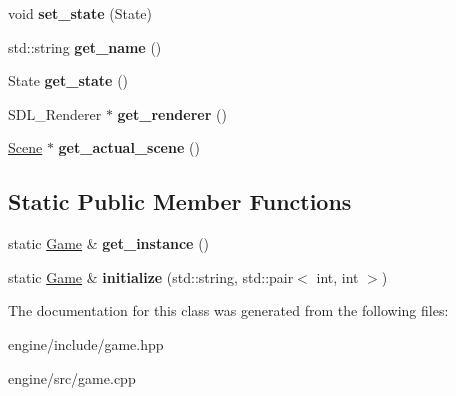 \begin{DoxyCompactItemize}
\item 
void {\bfseries set\+\_\+state} (State)\hypertarget{classengine_1_1_game_ad595dcad24a708d07939f050c02048ba}{}\label{classengine_1_1_game_ad595dcad24a708d07939f050c02048ba}

\item 
std\+::string {\bfseries get\+\_\+name} ()\hypertarget{classengine_1_1_game_a66f7b739325c22c7f782a947c83ceb7e}{}\label{classengine_1_1_game_a66f7b739325c22c7f782a947c83ceb7e}

\item 
State {\bfseries get\+\_\+state} ()\hypertarget{classengine_1_1_game_a3f1612365d0fa381d548294547efd105}{}\label{classengine_1_1_game_a3f1612365d0fa381d548294547efd105}

\item 
S\+D\+L\+\_\+\+Renderer $\ast$ {\bfseries get\+\_\+renderer} ()\hypertarget{classengine_1_1_game_a33c49c9cc938553b2458416c2ec2df5f}{}\label{classengine_1_1_game_a33c49c9cc938553b2458416c2ec2df5f}

\item 
\hyperlink{classengine_1_1_scene}{Scene} $\ast$ {\bfseries get\+\_\+actual\+\_\+scene} ()\hypertarget{classengine_1_1_game_ab8cb027a9a2b23ed81522b969c7b881c}{}\label{classengine_1_1_game_ab8cb027a9a2b23ed81522b969c7b881c}

\end{DoxyCompactItemize}
\subsection*{Static Public Member Functions}
\begin{DoxyCompactItemize}
\item 
static \hyperlink{classengine_1_1_game}{Game} \& {\bfseries get\+\_\+instance} ()\hypertarget{classengine_1_1_game_a540dd8cd1cc25d3918d852f5dc490644}{}\label{classengine_1_1_game_a540dd8cd1cc25d3918d852f5dc490644}

\item 
static \hyperlink{classengine_1_1_game}{Game} \& {\bfseries initialize} (std\+::string, std\+::pair$<$ int, int $>$)\hypertarget{classengine_1_1_game_ad776281b7ef3dee78dba15deec2ffcf0}{}\label{classengine_1_1_game_ad776281b7ef3dee78dba15deec2ffcf0}

\end{DoxyCompactItemize}


The documentation for this class was generated from the following files\+:\begin{DoxyCompactItemize}
\item 
engine/include/game.\+hpp\item 
engine/src/game.\+cpp\end{DoxyCompactItemize}
